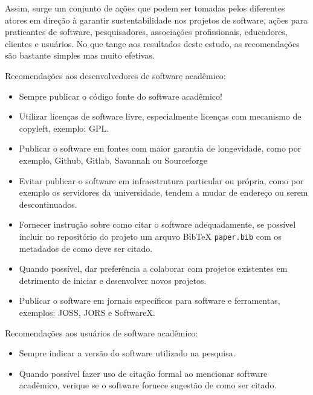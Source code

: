 Assim, surge um conjunto de ações que podem ser tomadas pelos diferentes atores
em direção à garantir sustentabilidade nos projetos de software, ações para
praticantes de software, pesquisadores, associações profissionais, educadores,
clientes e usuários. No que tange aos resultados deste estudo, as recomendações
são bastante simples mas muito efetivas.


Recomendações aos desenvolvedores de software acadêmico:

\begin{itemize}
  \item Sempre publicar o código fonte do software acadêmico!
  \item Utilizar licenças de software livre, especialmente licenças com mecanismo de copyleft, exemplo: GPL.
  \item Publicar o software em fontes com maior garantia de longevidade, como por exemplo, Github, Gitlab, Savannah ou Sourceforge
  \item Evitar publicar o software em infraestrutura particular ou própria, como por exemplo os servidores da universidade, tendem a mudar de endereço ou serem descontinuados.
  \item Fornecer instrução sobre como citar o software adequadamente, se possível incluir no repositório do projeto um arquvo BibTeX \texttt{paper.bib} com os metadados de como deve ser citado.
  \item Quando possível, dar preferência a colaborar com projetos existentes em detrimento de iniciar e desenvolver novos projetos.
  \item Publicar o software em jornais específicos para software e ferramentas, exemplos: JOSS, JORS e SoftwareX.
\end{itemize}

Recomendações aos usuários de software acadêmico:

\begin{itemize}
  \item Sempre indicar a versão do software utilizado na pesquisa.
  \item Quando possível fazer uso de citação formal ao mencionar software acadêmico, verique se o software fornece sugestão de como ser citado.
\end{itemize}

